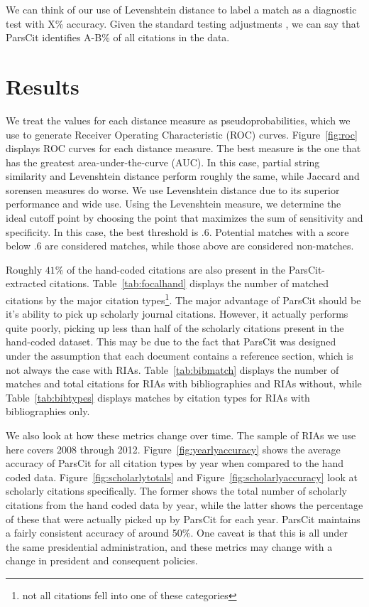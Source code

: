 \documentclass[12pt]{article}
\begin{document}
We can think of our use of Levenshtein distance to label a match as a diagnostic test with X\% accuracy. Given the standard testing adjustments \cite{pewsner2004}, we can say that ParsCit identifies A-B\% of all citations in the data.


\section{Results}
We treat the values for each distance measure as pseudoprobabilities, which we use to generate Receiver Operating Characteristic (ROC) curves. Figure~\ref{fig:roc} displays ROC curves for each distance measure. The best measure is the one that has the greatest area-under-the-curve (AUC). In this case, partial string similarity and Levenshtein distance perform roughly the same, while Jaccard and sorensen measures do worse. We use Levenshtein distance due to its superior performance and wide use. Using the Levenshtein measure, we determine the ideal cutoff point by choosing the point that maximizes the sum of sensitivity and specificity. In this case, the best threshold is .6. Potential matches with a score below .6 are considered matches, while those above are considered non-matches.

Roughly $41\%$ of the hand-coded citations are also present in the ParsCit-extracted citations. Table~\ref{tab:focalhand} displays the number of matched citations by the major citation types\footnote{not all citations fell into one of these categories}. The major advantage of ParsCit should be it's ability to pick up scholarly journal citations. However, it actually performs quite poorly, picking up less than half of the scholarly citations present in the hand-coded dataset. This may be due to the fact that ParsCit was designed under the assumption that each document contains a reference section, which is not always the case with RIAs. Table~\ref{tab:bibmatch} displays the number of matches and total citations for RIAs with bibliographies and RIAs without, while Table~\ref{tab:bibtypes} displays matches by citation types for RIAs with bibliographies only.

We also look at how these metrics change over time. The sample of RIAs we use here covers 2008 through 2012. Figure~\ref{fig:yearlyaccuracy} shows the average accuracy of ParsCit for all citation types by year when compared to the hand coded data. Figure~\ref{fig:scholarlytotals} and Figure~\ref{fig:scholarlyaccuracy} look at scholarly citations specifically. The former shows the total number of scholarly citations from the hand coded data by year, while the latter shows the percentage of these that were actually picked up by ParsCit for each year. ParsCit maintains a fairly consistent accuracy of around 50\%. One caveat is that this is all under the same presidential administration, and these metrics may change with a change in president and consequent policies.
\end{document}
